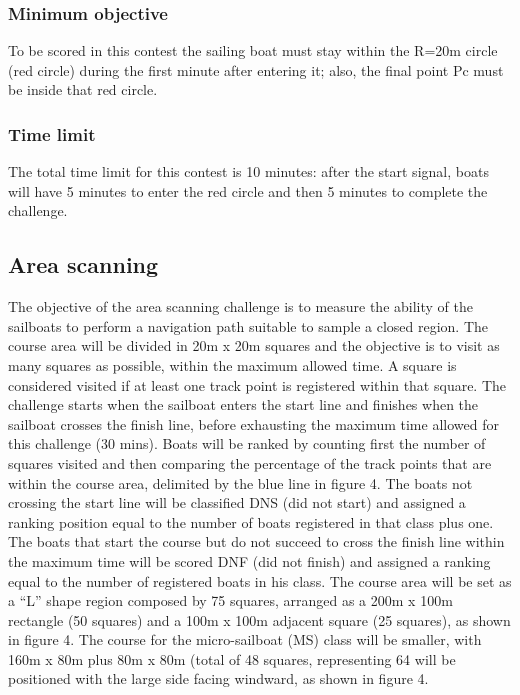 \documentclass[12pt]{article}
\begin{document}
\subsubsection{Minimum objective}
To be scored in this contest the sailing boat must stay within the R=20m circle
(red circle)
during the first minute after entering it; also, the final point Pc must be
inside that red circle.
\subsubsection{Time limit}
The total time limit for this contest is 10 minutes: after the start signal,
boats will have 5
minutes to enter the red circle and then 5 minutes to complete the challenge.

\subsection{Area scanning}

The objective of the area scanning challenge is to measure the ability of the
sailboats to perform
a navigation path suitable to sample a closed region. The course area will be
divided in 20m x
20m squares and the objective is to visit as many squares as possible, within
the maximum
allowed time. A square is considered visited if at least one track point is
registered within that
square.
The challenge starts when the sailboat enters the start line and finishes when
the sailboat
crosses the finish line, before exhausting the maximum time allowed for this
challenge (30
mins). Boats will be ranked by counting first the number of squares visited and
then comparing the percentage of the track points that are within the course
area, delimited by the
blue line in figure 4. The boats not crossing the start line will be classified
DNS (did not start)
and assigned a ranking position equal to the number of boats registered in that
class plus one.
The boats that start the course but do not succeed to cross the finish line
within the maximum
time will be scored DNF (did not finish) and assigned a ranking equal to the
number of registered
boats in his class. The course area will be set as a “L” shape region composed
by 75 squares, arranged as a 200m
x 100m rectangle (50 squares) and a 100m x 100m adjacent square (25 squares), as
shown in
figure 4. The course for the micro-sailboat (MS) class will be smaller, with
160m x 80m plus 80m
x 80m (total of 48 squares, representing 64%
will be positioned
with the large side facing windward, as shown in figure 4.
\end{document}
